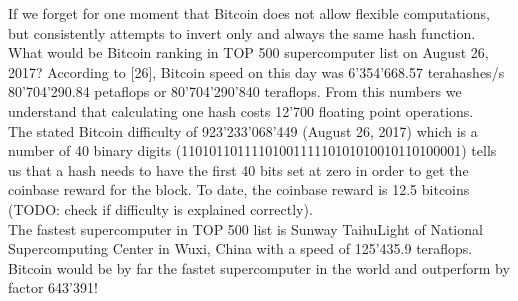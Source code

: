 If we forget for one moment that Bitcoin does not allow flexible computations, but consistently attempts to invert only and always the same hash function. What would be Bitcoin ranking in TOP 500 supercomputer list on August 26, 2017? According to [26], Bitcoin speed on this day was 6'354'668.57 terahashes/s 80'704'290.84 petaflops or 80'704'290'840 teraflops. From this numbers we understand that calculating one hash costs 12'700 floating point operations. \\

The stated Bitcoin difficulty of 923'233'068'449 (August 26, 2017) which is a number of 40 binary digits (1101011011110100111110101010010110100001) tells us that a hash needs to have the first 40 bits set at zero in order to get the coinbase reward for the block. To date, the coinbase reward is 12.5 bitcoins (TODO: check if difficulty is explained correctly).\\

The fastest supercomputer in TOP 500 list is Sunway TaihuLight of National Supercomputing Center in Wuxi, China with a speed of 125'435.9 teraflops. Bitcoin would be by far the fastet supercomputer in the world and outperform by factor 643'391!
